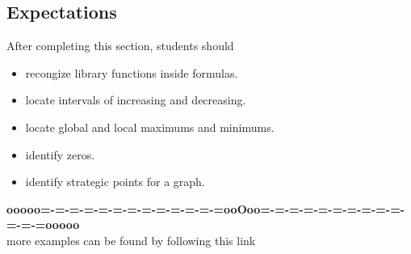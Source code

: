 \documentclass{ximera}
\begin{document}
\subsection{Expectations}

\begin{sectionOutcomes}
After completing this section, students should 

\begin{itemize}
\item recongize library functions inside formulas.
\item locate intervals of increasing and decreasing.
\item locate global and local maximums and minimums.
\item identify zeros.
\item identify strategic points for a graph.
\end{itemize}
\end{sectionOutcomes}














\begin{center}
\textbf{\textcolor{green!50!black}{ooooo=-=-=-=-=-=-=-=-=-=-=-=-=ooOoo=-=-=-=-=-=-=-=-=-=-=-=-=ooooo}} \\

more examples can be found by following this link\\ 

\end{center}
\end{document}
